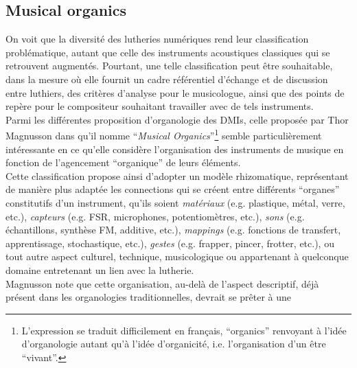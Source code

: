 \subsection{Musical organics}
\label{sec:ephemerality:musical-organics}

\noindent On voit que la diversité des lutheries numériques rend leur classification problématique, autant que celle des instruments acoustiques classiques qui se retrouvent augmentés. Pourtant, une telle classification peut être souhaitable, dans la mesure où elle fournit un cadre référentiel d'échange et de discussion entre luthiers, des critères d'analyse pour le musicologue, ainsi que des points de repère pour le compositeur souhaitant travailler avec de tels instruments. \\
\indent Parmi les différentes proposition d'organologie des \glspl{DMI}, celle proposée par Thor Magnusson dans \cite{magnusson_musical_2017} qu'il nomme ``\textit{Musical Organics}''\footnote{L'expression se traduit difficilement en français, ``organics'' renvoyant à l'idée d'organologie autant qu'à l'idée d'organicité, i.e. l'organisation d'un être ``vivant''.} semble particulièrement intéressante en ce qu'elle considère l'organisation des instruments de musique en fonction de l'agencement ``organique'' de leurs éléments.\\
\indent Cette classification propose ainsi d'adopter un modèle rhizomatique, représentant de manière plus adaptée les connections qui se créent entre différents ``organes'' constitutifs d'un instrument, qu'ils soient \textit{matériaux} (e.g. plastique, métal, verre, etc.), \textit{capteurs} (e.g. \gls{FSR}, microphones, potentiomètres, etc.), \textit{sons} (e.g. échantillons, synthèse FM, additive, etc.), \textit{\glspl{mapping}} (e.g. fonctions de transfert, apprentissage, stochastique, etc.), \textit{gestes} (e.g. frapper, pincer, frotter, etc.), ou tout autre aspect culturel, technique, musicologique ou appartenant à quelconque domaine entretenant un lien avec la lutherie.\\
\indent Magnusson note que cette organisation, au-delà de l'aspect descriptif, déjà présent dans les organologies traditionnelles, devrait se prêter à une 

